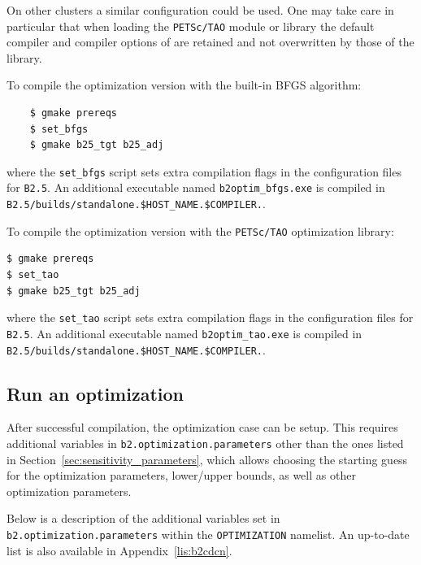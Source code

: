 On other clusters a similar configuration could be used. One may take care in particular that when loading the {\tt PETSc/TAO} module or library the default compiler and compiler options of \SOLPSITER are retained and not overwritten by those of the library.

To compile the optimization version with the built-in BFGS algorithm:
\begin{verbatim}
	$ gmake prereqs
	$ set_bfgs
	$ gmake b25_tgt b25_adj
\end{verbatim}
where the {\tt set\_bfgs} script sets extra compilation flags in the configuration files for {\tt B2.5}. An additional executable named {\tt b2optim\_bfgs.exe} is compiled in {\tt B2.5/builds/standalone.\allowbreak\$HOST\_NAME.\allowbreak\$COMPILER.}.

To compile the optimization version with the {\tt PETSc/TAO} optimization library:
\begin{verbatim}
$ gmake prereqs
$ set_tao
$ gmake b25_tgt b25_adj
\end{verbatim}
where the {\tt set\_tao} script sets extra compilation flags in the configuration files for {\tt B2.5}. An additional executable named {\tt b2optim\_tao.exe} is compiled in {\tt B2.5/builds/standalone.\allowbreak\$HOST\_NAME.\allowbreak\$COMPILER.}.

\subsection{Run an optimization}\label{sec:run_opt}

After successful compilation, the optimization case can be setup. This requires additional variables in {\tt b2\allowbreak.optimization\allowbreak.parameters} other than the ones listed in Section~\ref{sec:sensitivity_parameters}, which allows choosing the starting guess for the optimization parameters, lower/upper bounds, as well as other optimization parameters.

Below is a description of the additional variables set in {\tt b2.optimization.parameters} within the {\tt OPTIMIZATION} namelist. An up-to-date list is also available in Appendix~\ref{lis:b2cdcn}.

